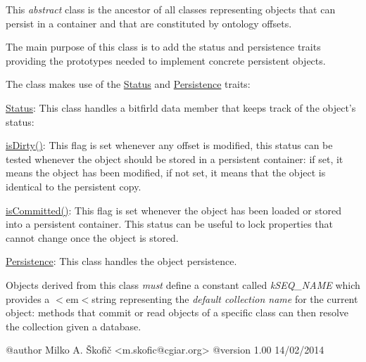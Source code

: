 This {\itshape abstract} class is the ancestor of all classes representing objects that can persist in a container and that are constituted by ontology offsets.

The main purpose of this class is to add the status and persistence traits providing the prototypes needed to implement concrete persistent objects.

The class makes use of the \hyperlink{}{Status} and \hyperlink{}{Persistence} traits\-:


\begin{DoxyItemize}
\item {\ttfamily \hyperlink{}{Status}}\-: This class handles a bitfirld data member that keeps track of the object's status\-: 
\begin{DoxyItemize}
\item {\ttfamily \hyperlink{}{is\-Dirty()}}\-: This flag is set whenever any offset is modified, this status can be tested whenever the object should be stored in a persistent container\-: if set, it means the object has been modified, if not set, it means that the object is identical to the persistent copy. 
\item {\ttfamily \hyperlink{}{is\-Committed()}}\-: This flag is set whenever the object has been loaded or stored into a persistent container. This status can be useful to lock properties that cannot change once the object is stored. 
\end{DoxyItemize}
\item {\ttfamily \hyperlink{}{Persistence}}\-: This class handles the object persistence. 
\end{DoxyItemize}

Objects derived from this class {\itshape must} define a constant called {\itshape k\-S\-E\-Q\-\_\-\-N\-A\-M\-E} which provides a $<$em$<$string representing the {\itshape default collection name} for the current object\-: methods that commit or read objects of a specific class can then resolve the collection given a database. \begin{DoxyVerb} @author            Milko A. Škofič <m.skofic@cgiar.org>
 @version   1.00 14/02/2014\end{DoxyVerb}
 

